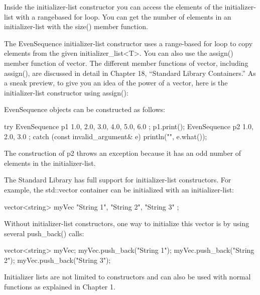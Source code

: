 Inside the initializer-list constructor you can access the elements of the initializer-list with a rangebased for loop. You can get the number of elements in an initializer-list with the size() member function.

The EvenSequence initializer-list constructor uses a range-based for loop to copy elements from the given initializer\_list<T>. You can also use the assign() member function of vector. The different member functions of vector, including assign(), are discussed in detail in Chapter 18, “Standard Library Containers.” As a sneak preview, to give you an idea of the power of a vector, here is the initializer-list constructor using assign():


EvenSequence objects can be constructed as follows:

\begin{cpp}
try {
    EvenSequence p1 { 1.0, 2.0, 3.0, 4.0, 5.0, 6.0 };
    p1.print();
    EvenSequence p2 { 1.0, 2.0, 3.0 };
} catch (const invalid_argument& e) {
    println("{}", e.what());
}
\end{cpp}

The construction of p2 throws an exception because it has an odd number of elements in the initializer-list.

The Standard Library has full support for initializer-list constructors. For example, the std::vector container can be initialized with an initializer-list:

\begin{cpp}
vector<string> myVec { "String 1", "String 2", "String 3" };
\end{cpp}

Without initializer-list constructors, one way to initialize this vector is by using several push\_back() calls:

\begin{cpp}
vector<string> myVec;
myVec.push_back("String 1");
myVec.push_back("String 2");
myVec.push_back("String 3");
\end{cpp}

Initializer lists are not limited to constructors and can also be used with normal functions as explained in Chapter 1.

